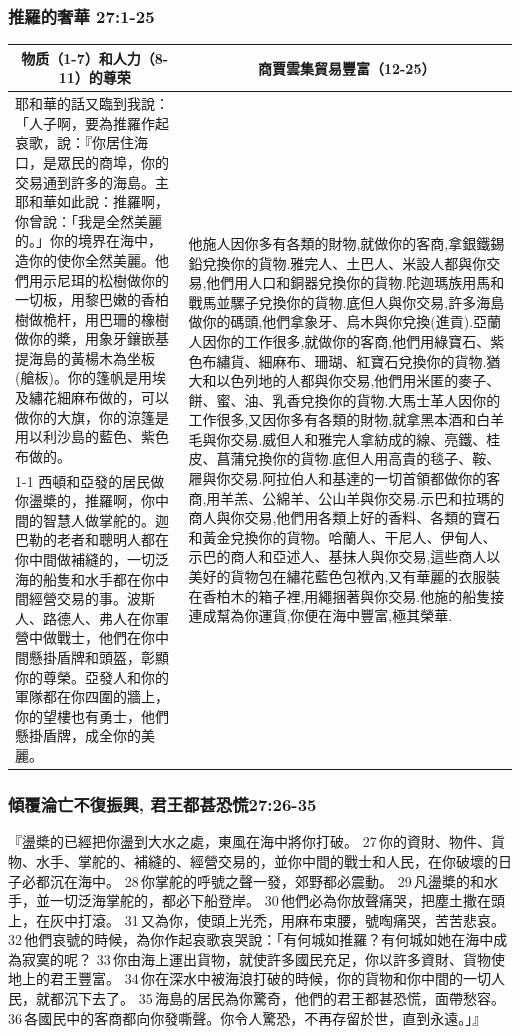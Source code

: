\subsubsection{推羅的奢華 27:1-25}
\begin{table}[H]
\centering
\begin{tabular}{p{7.85cm}|p{9.750cm}}\hline\hline
\multicolumn{1}{c|}{物质（1-7）和人力（8-11）的尊荣}&\multicolumn{1}{c}{商賈雲集貿易豐富（12-25）}\\\hline
耶和華的話又臨到我說：「人子啊，要為推羅作起哀歌，說：『你居住海口，是眾民的商埠，你的交易通到許多的海島。主耶和華如此說：推羅啊，你曾說：「我是全然美麗的。」你的境界在海中，造你的使你全然美麗。他們用示尼珥的松樹做你的一切板，用黎巴嫩的香柏樹做桅杆，用巴珊的橡樹做你的槳，用象牙鑲嵌基提海島的黃楊木為坐板(艙板)。你的篷帆是用埃及繡花細麻布做的，可以做你的大旗，你的涼篷是用以利沙島的藍色、紫色布做的。 
&\multirow{2}{10cm}{他施人因你多有各類的財物,就做你的客商,拿銀鐵錫鉛兌換你的貨物.雅完人、土巴人、米設人都與你交易,他們用人口和銅器兌換你的貨物.陀迦瑪族用馬和戰馬並騾子兌換你的貨物.底但人與你交易,許多海島做你的碼頭,他們拿象牙、烏木與你兌換(進貢).亞蘭人因你的工作很多,就做你的客商,他們用綠寶石、紫色布繡貨、細麻布、珊瑚、紅寶石兌換你的貨物.猶大和以色列地的人都與你交易,他們用米匿的麥子、餅、蜜、油、乳香兌換你的貨物.大馬士革人因你的工作很多,又因你多有各類的財物,就拿黑本酒和白羊毛與你交易.威但人和雅完人拿紡成的線、亮鐵、桂皮、菖蒲兌換你的貨物.底但人用高貴的毯子、鞍、屜與你交易.阿拉伯人和基達的一切首領都做你的客商,用羊羔、公綿羊、公山羊與你交易.示巴和拉瑪的商人與你交易,他們用各類上好的香料、各類的寶石和黃金兌換你的貨物。哈蘭人、干尼人、伊甸人、示巴的商人和亞述人、基抹人與你交易,這些商人以美好的貨物包在繡花藍色包袱內,又有華麗的衣服裝在香柏木的箱子裡,用繩捆著與你交易.他施的船隻接連成幫為你運貨,你便在海中豐富,極其榮華.}\\\cline{1-1}
西頓和亞發的居民做你盪槳的，推羅啊，你中間的智慧人做掌舵的。迦巴勒的老者和聰明人都在你中間做補縫的，一切泛海的船隻和水手都在你中間經營交易的事。波斯人、路德人、弗人在你軍營中做戰士，他們在你中間懸掛盾牌和頭盔，彰顯你的尊榮。亞發人和你的軍隊都在你四圍的牆上，你的望樓也有勇士，他們懸掛盾牌，成全你的美麗。&\\\hline
\end{tabular}
\end{table}


\subsubsection{傾覆淪亡不復振興, 君王都甚恐慌27:26-35}
『盪槳的已經把你盪到大水之處，東風在海中將你打破。 27 你的資財、物件、貨物、水手、掌舵的、補縫的、經營交易的，並你中間的戰士和人民，在你破壞的日子必都沉在海中。 28 你掌舵的呼號之聲一發，郊野都必震動。 29 凡盪槳的和水手，並一切泛海掌舵的，都必下船登岸。 30 他們必為你放聲痛哭，把塵土撒在頭上，在灰中打滾。 31 又為你，使頭上光禿，用麻布束腰，號啕痛哭，苦苦悲哀。 32 他們哀號的時候，為你作起哀歌哀哭說：「有何城如推羅？有何城如她在海中成為寂寞的呢？ 33 你由海上運出貨物，就使許多國民充足，你以許多資財、貨物使地上的君王豐富。 34 你在深水中被海浪打破的時候，你的貨物和你中間的一切人民，就都沉下去了。 35 海島的居民為你驚奇，他們的君王都甚恐慌，面帶愁容。 36 各國民中的客商都向你發嘶聲。你令人驚恐，不再存留於世，直到永遠。」』


